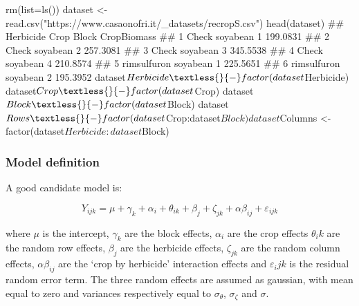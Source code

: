 \documentclass[a4paper,12pt,oneside]{book}
\newenvironment{Shaded}{\begin{snugshade}}{\end{snugshade}}
\newcommand{\SpecialCharTok}[1]{#1}
\newcommand{\StringTok}[1]{#1}
\newcommand{\DocumentationTok}[1]{#1}
\newcommand{\OtherTok}[1]{#1}
\newcommand{\FunctionTok}[1]{#1}
\newcommand{\AttributeTok}[1]{#1}
\newcommand{\NormalTok}[1]{#1}
\begin{document}
\begin{Shaded}
\begin{Highlighting}[]
\FunctionTok{rm}\NormalTok{(}\AttributeTok{list=}\FunctionTok{ls}\NormalTok{())}
\NormalTok{dataset }\OtherTok{\textless{}{-}} \FunctionTok{read.csv}\NormalTok{(}\StringTok{"https://www.casaonofri.it/\_datasets/recropS.csv"}\NormalTok{)}
\FunctionTok{head}\NormalTok{(dataset)}
\DocumentationTok{\#\#     Herbicide     Crop Block CropBiomass}
\DocumentationTok{\#\# 1       Check soyabean     1    199.0831}
\DocumentationTok{\#\# 2       Check soyabean     2    257.3081}
\DocumentationTok{\#\# 3       Check soyabean     3    345.5538}
\DocumentationTok{\#\# 4       Check soyabean     4    210.8574}
\DocumentationTok{\#\# 5 rimsulfuron soyabean     1    225.5651}
\DocumentationTok{\#\# 6 rimsulfuron soyabean     2    195.3952}
\NormalTok{dataset}\SpecialCharTok{$}\NormalTok{Herbicide }\OtherTok{\textless{}{-}} \FunctionTok{factor}\NormalTok{(dataset}\SpecialCharTok{$}\NormalTok{Herbicide)}
\NormalTok{dataset}\SpecialCharTok{$}\NormalTok{Crop }\OtherTok{\textless{}{-}} \FunctionTok{factor}\NormalTok{(dataset}\SpecialCharTok{$}\NormalTok{Crop)}
\NormalTok{dataset}\SpecialCharTok{$}\NormalTok{Block }\OtherTok{\textless{}{-}} \FunctionTok{factor}\NormalTok{(dataset}\SpecialCharTok{$}\NormalTok{Block)}
\NormalTok{dataset}\SpecialCharTok{$}\NormalTok{Rows }\OtherTok{\textless{}{-}} \FunctionTok{factor}\NormalTok{(dataset}\SpecialCharTok{$}\NormalTok{Crop}\SpecialCharTok{:}\NormalTok{dataset}\SpecialCharTok{$}\NormalTok{Block)}
\NormalTok{dataset}\SpecialCharTok{$}\NormalTok{Columns }\OtherTok{\textless{}{-}} \FunctionTok{factor}\NormalTok{(dataset}\SpecialCharTok{$}\NormalTok{Herbicide}\SpecialCharTok{:}\NormalTok{dataset}\SpecialCharTok{$}\NormalTok{Block)}
\end{Highlighting}
\end{Shaded}

\hypertarget{model-definition-5}{%
\subsubsection{Model definition}\label{model-definition-5}}

A good candidate model is:

\[Y_{ijk} = \mu + \gamma_k + \alpha_i + \theta_{ik} + \beta_j + \zeta_{jk} + \alpha\beta_{ij} + \varepsilon_{ijk}\]

where \(\mu\) is the intercept, \(\gamma_k\) are the block effects, \(\alpha_i\) are the crop effects \(\theta_ik\) are the random row effects, \(\beta_j\) are the herbicide effects, \(\zeta_{jk}\) are the random column effects, \(\alpha\beta_{ij}\) are the `crop by herbicide' interaction effects and \(\varepsilon_ijk\) is the residual random error term. The three random effects are assumed as gaussian, with mean equal to zero and variances respectively equal to \(\sigma_{\theta}\), \(\sigma_{\zeta}\) and \(\sigma\).
\end{document}
